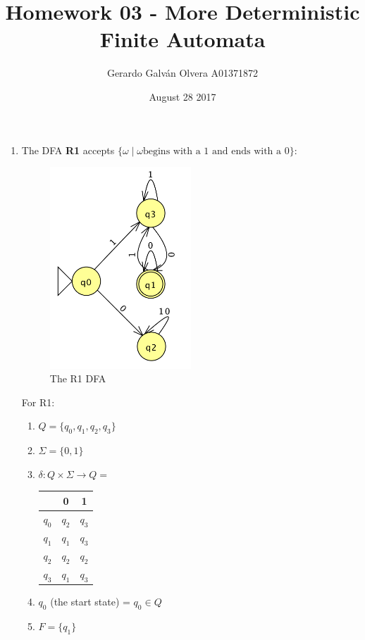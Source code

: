 \documentclass[11pt,a4paper]{article}
\title{Homework 03 - More Deterministic Finite Automata}
\author{Gerardo Galván Olvera A01371872}
\date{August 28 2017}
\begin{document}
        \maketitle
                
        \begin{enumerate}
            \item The DFA \textbf{R1} accepts $\{\omega\mid\omega\text{begins with a 1 and ends with a 0}\}$:\\
                \begin{figure}[H]
                    \centering
                    \includegraphics[width=0.50\textwidth]{A1}
                    \caption{The R1 DFA}
                \end{figure}

                For R1:
                \begin{enumerate}
                    \item $Q = \{q_0, q_1, q_2, q_3\}$
                    \item $\Sigma = \{0, 1\}$
                    \item $\delta \colon Q \times \Sigma \rightarrow Q =$
                    \begin{tabular}{c|c|c}
                         & 0 & 1 \\ \hline
                        $q_0$ & $q_2$ & $q_3$ \\ \hline
                        $q_1$ & $q_1$ & $q_3$ \\ \hline
                        $q_2$ & $q_2$ & $q_2$ \\ \hline
                        $q_3$ & $q_1$ & $q_3$ \\ \hline
                    \end{tabular}
                    \item $q_0$ (the start state) = $q_0 \in Q$
                    \item $F = \{q_1\}$
                \end{enumerate}


\end{enumerate}
\end{document}
